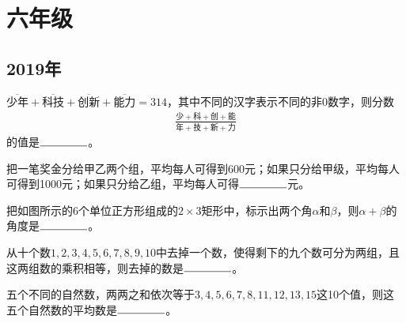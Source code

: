 \chapter{六年级}
\label{chap:pengcheng-grade6}

\section{2019年}
\label{sec:pengcheng-grade6-2019}

\begin{question}
  $\overline{\text{少年}} + \overline{\text{科技}} + \overline{\text{创新}} + \overline{\text{能力}} = 314$，其中不同的汉字表示不同的非0数字，则分数
  \begin{align*}
    \frac{\text{少} + \text{科} + \text{创} + \text{能}}{\text{年} + \text{技} + \text{新} + \text{力}}
  \end{align*}
  的值是$\blankline$。
\end{question}


\begin{question}
  把一笔奖金分给甲乙两个组，平均每人可得到600元；如果只分给甲级，平均每人可得到1000元；如果只分给乙组，平均每人可得$\blankline$元。
\end{question}


\begin{question}
  把如图所示的6个单位正方形组成的$2\times 3$矩形中，标示出两个角$\alpha$和$\beta$，则$\alpha + \beta$的角度是$\blankline$。

  \begin{center}
  \end{center}
\end{question}


\begin{question}
  从十个数$1,2,3,4,5,6,7,8,9,10$中去掉一个数，使得剩下的九个数可分为两组，且这两组数的乘积相等，则去掉的数是$\blankline$。
\end{question}


\begin{question}
  五个不同的自然数，两两之和依次等于$3,4,5,6,7,8,11,12,13,15$这10个值，则这五个自然数的平均数是$\blankline$。
\end{question}



